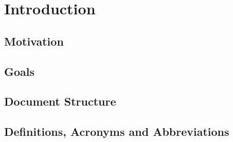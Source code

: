 \chapter{Introduction}

\section{Motivation}


\section{Goals}


\section{Document Structure}


\section{Definitions, Acronyms and Abbreviations}
